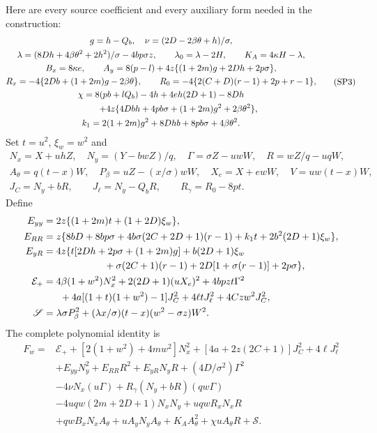 Here are every source coefficient and every auxiliary form needed
in the construction:
\[
 \begin{gathered}
 g=h-Q_b,\quad \nu=(2D-2\beta\theta+h)/\sigma,\\
 \lambda=(8Dh+4\beta\theta^2+2h^2)/\sigma-4bp\sigma z,\qquad
 \lambda_0=\lambda-2H,\qquad K_A=4\kappa H-\lambda,\\
 B_x=8\kappa e,\qquad
 A_y=8(p-l)+4z\{(1+2m)g+2Dh+2p\sigma\},\\
 R_x=-4\{2Db+(1+2m)g-2\beta\theta\},\qquad
 R_0=-4\{2(C+D)(r-1)+2p+r-1\},\\
 \chi=8(pb+lQ_b)-4h+4eh(2D+1)-8Dh\\
 \hspace{14mm}
     +4z\{4Dbh+4pb\sigma+(1+2m)g^2+2\beta\theta^2\},\\
 k_1=2(1+2m)g^2+8Dhb+8pb\sigma+4\beta\theta^2 .
 \end{gathered}\tag{SP3}
\]
Set $t=u^2$, $\xi_w=w^2$ and
\[
 \begin{gathered}
 N_x=X+uhZ,\quad N_y=(Y-bwZ)/q,\quad
 \Gamma=\sigma Z-uwW,\quad R=wZ/q-uqW,\\
 A_\theta=q(t-x)W,\quad P_\beta=uZ-(x/\sigma)wW,\quad
 X_e=X+ewW,\quad V=uw(t-x)W,\\
 J_C=N_y+bR,\qquad J_\ell=N_y-Q_bR,\qquad R_\gamma=R_0-8pt.
 \end{gathered}
\]
Define
\[
 \begin{split}
 E_{yy}&=2z\{(1+2m)t+(1+2D)\xi_w\},\\
 E_{RR}&=z\{8bD+8bp\sigma+4b\sigma(2C+2D+1)(r-1)
                     +k_1t+2b^2(2D+1)\xi_w\},\\
 E_{yR}&=4z\{t[2Dh+2p\sigma+(1+2m)g]+b(2D+1)\xi_w\\
 &\hspace{22mm}+\sigma(2C+1)(r-1)
                     +2D[1+\sigma(r-1)]+2p\sigma\},\\
 \mathcal E_+&=4\beta(1+w^2)N_x^2+2(2D+1)(uX_e)^2
       +4bpzt\Gamma^2\\
 &\hspace{6mm}+4a[(1+t)(1+w^2)-1]J_C^2
       +4\ell tJ_\ell^2+4Cz w^2J_C^2,\\
 \mathscr S&=\lambda\sigma P_\beta^2+
                 (\lambda x/\sigma)(t-x)(w^2-\sigma z)W^2 .
 \end{split}
\]
The complete polynomial identity is
\begin{align*}
 F_w={}&\mathcal E_++[2(1+w^2)+4mw^2]N_x^2
       +[4a+2z(2C+1)]J_C^2+4\ell J_\ell^2\\
 &+E_{yy}N_y^2+E_{RR}R^2+E_{yR}N_yR+(4D/\sigma^2)\Gamma^2\\
 &-4\nu N_x(u\Gamma)+R_\gamma(N_y+bR)(qw\Gamma)\\
 &-4uqw(2m+2D+1)N_xN_y+uqwR_xN_xR\\
 &+qwB_xN_xA_\theta+uA_yN_yA_\theta
        +K_AA_\theta^2+\chi uA_\theta R+\mathscr S .
 \tag{SP6}
\end{align*}
